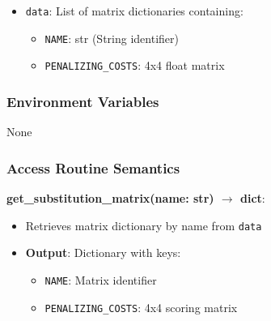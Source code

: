 \documentclass[12pt, titlepage]{article}
\begin{document}
\begin{itemize}
    \item \texttt{data}: List of matrix dictionaries containing:
    \begin{itemize}
        \item \texttt{NAME}: str (String identifier)
        \item \texttt{PENALIZING\_COSTS}: 4x4 float matrix
    \end{itemize}
\end{itemize}

\subsubsection{Environment Variables}

None



\subsubsection{Access Routine Semantics}

\noindent \textbf{get\_substitution\_matrix(name: str) $\rightarrow$ dict}:
\begin{itemize}
    \item Retrieves matrix dictionary by name from \texttt{data}
    \item \textbf{Output}: Dictionary with keys:
    \begin{itemize}
        \item \texttt{NAME}: Matrix identifier
        \item \texttt{PENALIZING\_COSTS}: 4x4 scoring matrix
    \end{itemize}
\end{itemize}
\end{document}
